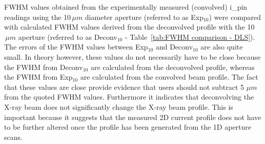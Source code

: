 FWHM values obtained from the experimentally measured (convolved) i\_pin readings using the 10$\,\mu m$ diameter aperture (referred to as Exp$_{\text{10}}$) were compared with calculated FWHM values derived from the deconvolved profile with the 10$\,\mu m$ aperture (referred to as Deconv$_{\text{10}}$ - Table~\ref{tab:FWHM comparison - DLS}).
The errors of the FWHM values between Exp$_{\text{10}}$ and Deconv$_{\text{10}}$ are also quite small.
In theory however, these values do not necessarily have to be close because the FWHM from Deconv$_{\text{10}}$ are calculated from the deconvolved profile, whereas the FWHM from Exp$_{\text{10}}$  are calculated from the convolved beam profile.
The fact that these values are close provide evidence that users should not subtract 5 $\mu m$ from the quoted FWHM values.
Furthermore it indicates that deconvolving the X-ray beam does not significantly change the X-ray beam profile.
This is important because it suggests that the measured 2D current profile does not have to be further altered once the profile has been generated from the 1D aperture scans.
